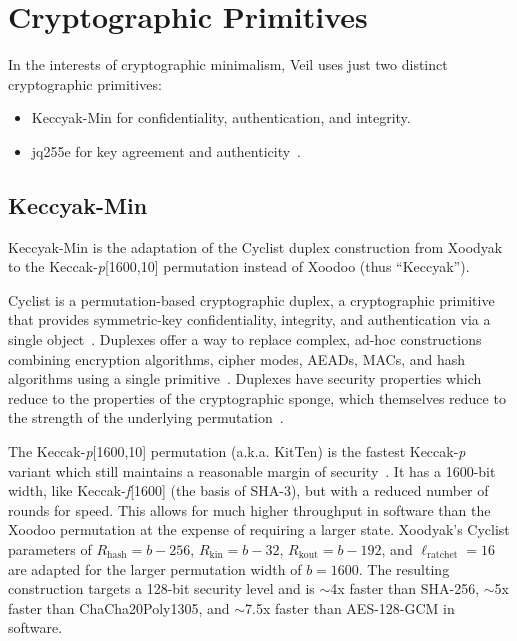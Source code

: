 \section{Cryptographic Primitives}\label{sec:cryptographic-primitives}

In the interests of cryptographic minimalism, Veil uses just two distinct cryptographic primitives:

\begin{itemize}
    \item Keccyak-Min for confidentiality, authentication, and integrity.
    \item jq255e for key agreement and authenticity~\cite{pornin2022}\@.
\end{itemize}

\subsection{Keccyak-Min}\label{subsec:keccyak}

Keccyak-Min is the adaptation of the Cyclist duplex construction from Xoodyak~\cite{daemen2020} to
the Keccak-\emph{p}[1600,10] permutation instead of Xoodoo (thus ``Keccyak'').

Cyclist is a permutation-based cryptographic duplex, a cryptographic primitive that provides
symmetric-key confidentiality, integrity, and authentication via a single
object~\cite{daemen2020}\@. Duplexes offer a way to replace complex, ad-hoc constructions combining
encryption algorithms, cipher modes, AEADs, MACs, and hash algorithms using a single
primitive~\cite{daemen2020, bertoni2011duplex}\@. Duplexes have security properties which reduce to
the properties of the cryptographic sponge, which themselves reduce to the strength of the
underlying permutation~\cite{bertoni2008}\@.

The Keccak-\emph{p}[1600,10] permutation (a.k.a. KitTen) is the fastest Keccak-\emph{p} variant
which still maintains a reasonable margin of security~\cite{aumasson2019}.  It has a 1600-bit width,
like Keccak-\emph{f}[1600] (the basis of SHA-3)\@, but with a reduced number of rounds for speed.
This allows for much higher throughput in software than the Xoodoo permutation at the expense of
requiring a larger state.  Xoodyak's Cyclist parameters of $R_\text{hash}=b-256$,
$R_\text{kin}=b-32$, $R_\text{kout}=b-192$, and $\ell_\text{ratchet}=16$ are adapted for the larger
permutation width of $b=1600$. The resulting construction targets a 128-bit security level and is
$\sim$4x faster than SHA-256, $\sim$5x faster than ChaCha20Poly1305, and $\sim$7.5x faster than
AES-128-GCM in software.

